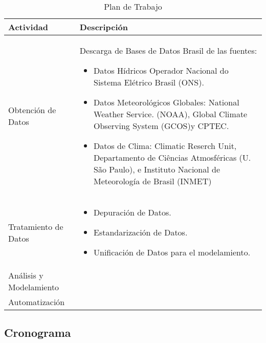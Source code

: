 \documentclass[10pt,a5paper]{article}
\begin{document}
\begin{table}[h!]
\centering

\label{TablaPlan}
\begin{tabular}{|p{2.3cm}|p{7cm}|}
\hline
Actividad  & Descripción  \\ \hline

Obtención de Datos &  Descarga de Bases de Datos Brasil de las fuentes: 

\begin{itemize}

\item Datos Hídricos Operador Nacional do Sistema Elétrico Brasil (ONS).
\item Datos Meteorológicos Globales: National Weather Service. (NOAA), Global Climate Observing System (GCOS)y CPTEC.
\item Datos de Clima: Climatic Reserch Unit, Departamento de Ciências Atmosféricas (U. São Paulo), e Instituto Nacional de Meteorología de Brasil (INMET)
\end{itemize}

 \\ \hline

Tratamiento de Datos  &  

\begin{itemize}
\item Depuración de Datos.
\item Estandarización de Datos.
\item Unificación de Datos para el modelamiento.
\end{itemize}

 \\ \hline


Análisis y Modelamiento &   \\ \hline

Automatización &  \\ \hline

\end{tabular}
\caption{Plan de Trabajo}
\end{table}



\subsection{Cronograma}
\end{document}
